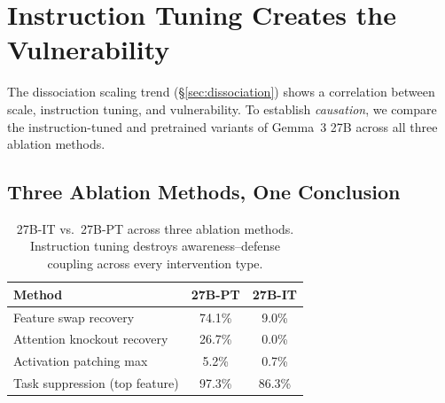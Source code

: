 \documentclass[10pt,twocolumn]{article}
\newcommand{\gemma}{Gemma~3\xspace}
\begin{document}
\section{Instruction Tuning Creates the Vulnerability}
\label{sec:it_creates}

The dissociation scaling trend (\S\ref{sec:dissociation}) shows a correlation between scale, instruction tuning, and vulnerability.
To establish \emph{causation}, we compare the instruction-tuned and pretrained variants of \gemma 27B across all three ablation methods.

\subsection{Three Ablation Methods, One Conclusion}

\begin{table}[t]
\centering
\caption{27B-IT vs.\ 27B-PT across three ablation methods. Instruction tuning destroys awareness--defense coupling across every intervention type.}
\label{tab:it_vs_pt}
\small
\begin{tabular}{@{}lcc@{}}
\toprule
\textbf{Method} & \textbf{27B-PT} & \textbf{27B-IT} \\
\midrule
Feature swap recovery         & 74.1\% & 9.0\%  \\
Attention knockout recovery   & 26.7\% & 0.0\%  \\
Activation patching max       & 5.2\%  & 0.7\%  \\
Task suppression (top feature) & 97.3\% & 86.3\% \\
\bottomrule
\end{tabular}
\end{table}
\end{document}
